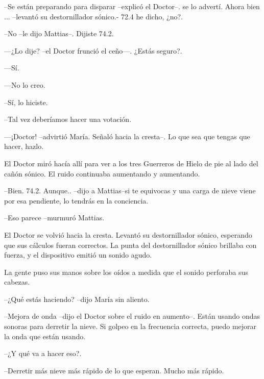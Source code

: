--Se están preparando para disparar --explicó el Doctor--. se lo advertí. Ahora bien ... --levantó su destornillador sónico.- 72.4 he dicho, ¿no?.



--No --le dijo Mattias--. Dijiste 74.2.



—¿Lo dije? --el Doctor frunció el ceño—. ¿Estás seguro?.



—Sí.



—No lo creo.



--Sí, lo hiciste.



--Tal vez deberíamos hacer una votación.



—¡Doctor! --advirtió María. Señaló hacia la cresta--. Lo que sea que tengas que hacer, hazlo.



El Doctor miró hacía allí para ver a los tres Guerreros de Hielo de pie al lado del cañón sónico. El ruido continuaba aumentando y aumentando.



--Bien. 74.2.  Aunque.. --dijo a Mattias--si te equivocas y una carga de nieve viene por esa pendiente, lo tendrás en la conciencia.



--Eso parece --murmuró Mattias.


El Doctor se volvió hacia la cresta. Levantó su destornillador sónico, esperando que sus cálculos fueran correctos. La punta del destornillador sónico brillaba con fuerza, y el dispositivo emitió un sonido agudo.



La gente puso sus manos sobre los oídos a medida que el sonido perforaba sus cabezas.



--¿Qué estás haciendo? --dijo María sin aliento.



--Mejora de onda --dijo el Doctor sobre el ruido en aumento--. Están usando ondas sonoras para derretir la nieve. Si golpeo en la frecuencia correcta, puedo mejorar la onda que están usando.



--¿Y qué va a hacer eso?.



--Derretir más nieve más rápido de lo que esperan. Mucho más rápido.



